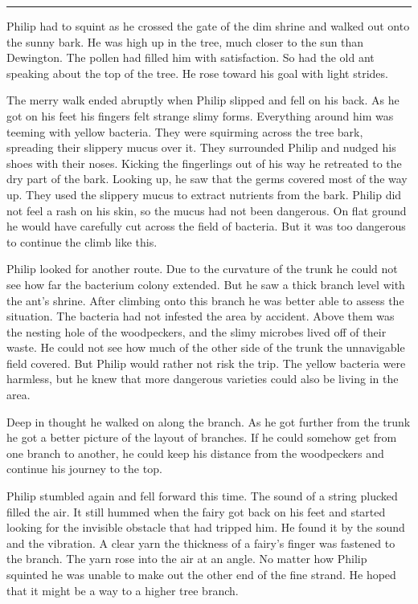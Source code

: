 \documentclass[10pt]{memoir}
\renewcommand{\pfbreakdisplay}{\bigskip \ding{166} \bigskip}
\newcommand{\secbreak}{\fancybreak{\pfbreakdisplay}}
\begin{document}
\secbreak

Philip had to squint as he crossed the gate of the dim shrine and walked out
onto the sunny bark. He was high up in the tree, much closer to the sun than
Dewington. The pollen had filled him with satisfaction. So had the old ant
speaking about the top of the tree. He rose toward his goal with light strides.

The merry walk ended abruptly when Philip slipped and fell on his back. As he
got on his feet his fingers felt strange slimy forms. Everything around him was
teeming with yellow bacteria. They were squirming across the tree bark, spreading
their slippery mucus over it. They surrounded Philip and nudged his shoes with
their noses. Kicking the fingerlings out of his way he retreated to the dry
part of the bark. Looking up, he saw that the germs covered most of the way up.
They used the slippery mucus to extract nutrients from the bark. Philip did
not feel a rash on his skin, so the mucus had not been dangerous. On flat
ground he would have carefully cut across the field of bacteria. But it was too
dangerous to continue the climb like this.

Philip looked for another route. Due to the curvature of the trunk he could not
see how far the bacterium colony extended. But he saw a thick branch level with
the ant's shrine. After climbing onto this branch he was better able to assess
the situation. The bacteria had not infested the area by accident. Above them
was the nesting hole of the woodpeckers, and the slimy microbes lived off of
their waste. He could not see how much of the other side of the trunk the
unnavigable field covered. But Philip would rather not risk the trip. The
yellow bacteria were harmless, but he knew that more dangerous varieties could
also be living in the area.

Deep in thought he walked on along the branch. As he got further from the trunk
he got a better picture of the layout of branches. If he could somehow get from
one branch to another, he could keep his distance from the woodpeckers and
continue his journey to the top.

Philip stumbled again and fell forward this time. The sound of a string plucked
filled the air. It still hummed when the fairy got back on his feet and started
looking for the invisible obstacle that had tripped him. He found it by the
sound and the vibration. A clear yarn the thickness of a fairy's finger was
fastened to the branch. The yarn rose into the air at an angle. No matter how
Philip squinted he was unable to make out the other end of the fine strand. He
hoped that it might be a way to a higher tree branch.
\end{document}
